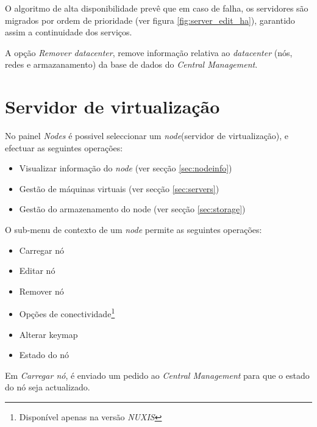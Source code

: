 O algoritmo de alta disponibilidade prevê que em caso de falha, os servidores são migrados por ordem de prioridade (ver figura \ref{fig:server_edit_ha}), garantido assim a continuidade dos serviços.

A opção \emph{Remover datacenter}, remove informação relativa ao \emph{datacenter} (nós, redes e armazanamento) da base de dados do \emph{Central Management}.


\section{Servidor de virtualização}
\label{sec:node}

No painel \emph{Nodes} é possivel seleccionar um \emph{node}(servidor de virtualização), e efectuar as seguintes operações:
\begin{itemize}
    \item Visualizar informação do \emph{node} (ver secção \ref{sec:nodeinfo})
    \item Gestão de máquinas virtuais (ver secção \ref{sec:servers})
    \item Gestão do armazenamento do node (ver secção \ref{sec:storage})
\end{itemize}

O sub-menu de contexto de um \emph{node} permite as seguintes operações:
\begin{itemize}
    \item Carregar nó
    \item Editar nó
    \item Remover nó
    \item Opções de conectividade\footnote{Disponível apenas na versão \emph{NUXIS}}
    \item Alterar keymap
    \item Estado do nó
\end{itemize}

Em \emph{Carregar nó}, é enviado um pedido ao \emph{Central Management} para que o estado do nó seja actualizado. 

